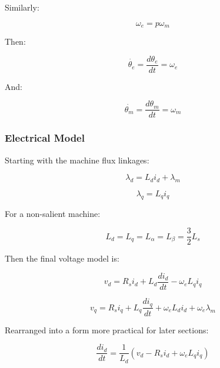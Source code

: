 \documentclass{article}
\begin{document}
Similarly:

\begin{equation}
    \omega_e = p\omega_m
\end{equation}

Then:

\begin{equation}
    \dot{\theta_e} = \frac{d\theta_e}{dt} = \omega_e
\end{equation}

And:

\begin{equation}
    \dot{\theta_m} = \frac{d\theta_m}{dt} = \omega_m
\end{equation}


\subsubsection{Electrical Model}


Starting with the machine flux linkages:

\begin{equation}
    \lambda_d = L_di_d + \lambda_m
\end{equation}

\begin{equation}
    \lambda_q = L_qi_q
\end{equation}

For a non-salient machine:

\begin{equation}
    L_d = L_q = L_\alpha = L_\beta = \frac{3}{2}L_s
\end{equation}

Then the final voltage model is:

\begin{equation}
    \boxed{
    v_d = R_si_d + L_d\frac{di_d}{dt} - \omega_eL_qi_q
    }
\end{equation}

\begin{equation}
    \boxed{
    v_q = R_si_q + L_q\frac{di_q}{dt} + \omega_eL_di_d + \omega_e\lambda_m
    }
\end{equation}

Rearranged into a form more practical for later sections:

\begin{equation}
    \boxed{
    \frac{di_d}{dt} = \frac{1}{L_d}(v_d - R_si_d + \omega_eL_qi_q)
    }
\end{equation}
\end{document}
